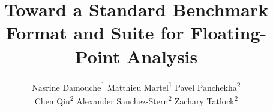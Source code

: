 \documentclass{llncs}
\begin{document}
\title{Toward a Standard Benchmark Format and Suite for Floating-Point Analysis}
\author{
  Nasrine Damouche\textsuperscript{1} \hspace{0.1in}
  Matthieu Martel\textsuperscript{1} \hspace{0.1in}
  Pavel Panchekha\textsuperscript{2} \\
  Chen Qiu\textsuperscript{2} \hspace{0.1in}
  Alexander Sanchez-Stern\textsuperscript{2} \hspace{0.1in}
  Zachary Tatlock\textsuperscript{2}
}
\maketitle












\end{document}
